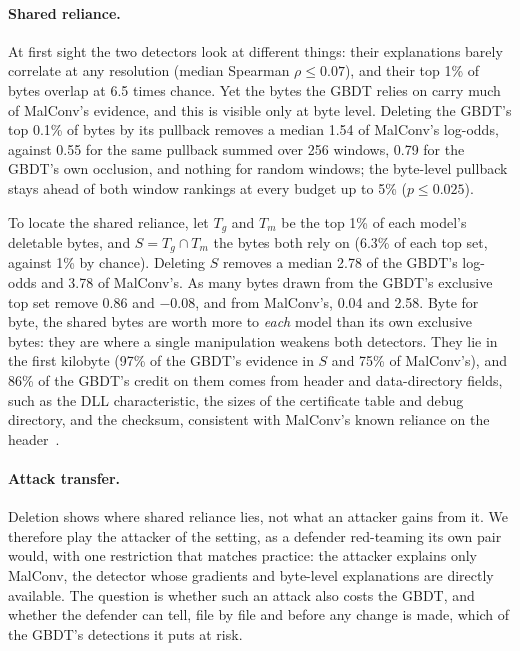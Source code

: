 \paragraph{Shared reliance.} At first sight the two detectors look at different things: their explanations barely
correlate at any resolution (median Spearman $\rho \leq 0.07$), and their top 1\% of bytes overlap at 6.5 times
chance. Yet the bytes the GBDT relies on carry much of MalConv's evidence, and this is visible only at byte level.
Deleting the GBDT's top 0.1\% of bytes by its pullback removes a median 1.54 of MalConv's log-odds, against 0.55 for
the same pullback summed over 256 windows, 0.79 for the GBDT's own occlusion, and nothing for random windows; the
byte-level pullback stays ahead of both window rankings at every budget up to 5\% ($p \leq 0.025$).

To locate the shared reliance, let $T_g$ and $T_m$ be the top 1\% of each model's deletable bytes, and
$S = T_g \cap T_m$ the bytes both rely on (6.3\% of each top set, against 1\% by chance). Deleting $S$ removes a median
2.78 of the GBDT's log-odds and 3.78 of MalConv's. As many bytes drawn from the GBDT's exclusive top set remove 0.86
and $-0.08$, and from MalConv's, 0.04 and 2.58. Byte for byte, the shared bytes are worth more to \emph{each} model
than its own exclusive bytes: they are where a single manipulation weakens both detectors. They lie in the first
kilobyte (97\% of the GBDT's evidence in $S$ and 75\% of MalConv's), and 86\% of the GBDT's credit on them comes from
header and data-directory fields, such as the DLL characteristic, the sizes of the certificate table and debug
directory, and the checksum, consistent with MalConv's known reliance on the header~\cite{demetrio2019explaining}.

\paragraph{Attack transfer.} Deletion shows where shared reliance lies, not what an attacker gains from it. We
therefore play the attacker of the setting, as a defender red-teaming its own pair would, with one restriction that
matches practice: the attacker explains only MalConv, the detector whose gradients and byte-level explanations are
directly available. The question is whether such an attack also costs the GBDT, and whether the defender can tell, file
by file and before any change is made, which of the GBDT's detections it puts at risk.

